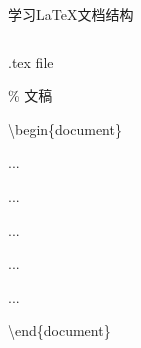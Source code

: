 \documentclass[fontset = adobe, xcolor=svgnames, t, aspectratio=169]{ctexbeamer}
\begin{document}
\begin{frame}[t, fragile]{学习\LaTeX}{文档结构}
\begin{columns}
\begin{column}{0.45\textwidth}
\begin{block}{.tex file}
{       \par
       { \% 文稿 \par
       \textbackslash begin\{document\} \par
       ... \par
        \par
       \quad ... \par
        \par
       \qquad ... \par
       \quad {} \par
       \qquad ... \par
        \par
       ... \par
       \par
       \textbackslash end\{document\} \par
       } }
     \end{block}
   \end{column}
 \end{columns}
\end{frame}
\end{document}
